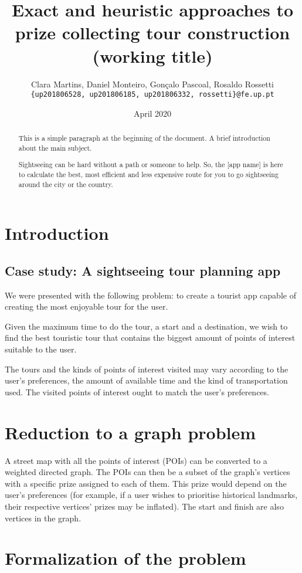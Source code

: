\documentclass{article}
\title{Exact and heuristic approaches to prize collecting tour construction (working title)}
\author{Clara Martins, Daniel Monteiro, Gonçalo Pascoal, Rosaldo Rossetti \\
\normalsize \texttt{\{up201806528, up201806185, up201806332, rossetti\}@fe.up.pt}}
\date{April 2020}
\begin{document}
\maketitle

\begin{abstract}
This is a simple paragraph at the beginning of the 
document. A brief introduction about the main subject.

Sightseeing can be hard without a path or someone to help. So, the [app name] is here to calculate the best, most efficient and less expensive route for you to go sightseeing around the city or the country.
\end{abstract}

\section{Introduction}

\subsection{Case study: A sightseeing tour planning app}
We were presented with the following problem: to create a tourist app capable of creating the most enjoyable tour for the user.

Given the maximum time to do the tour, a start and a destination, we wish to find the best touristic tour that contains the biggest amount of points of interest suitable to the user.

The tours and the kinds of points of interest visited may vary according to the user's preferences, the amount of available time and the kind of transportation used. The visited points of interest ought to match the user's preferences.

\section{Reduction to a graph problem}

A street map with all the points of interest (POIs) can be converted to a weighted directed graph. The POIs can then be a subset of the graph's vertices with a specific prize assigned to each of them. This prize would depend on the user's preferences (for example, if a user wishes to prioritise historical landmarks, their respective vertices' prizes may be inflated). The start and finish are also vertices in the graph. 

\section{Formalization of the problem}
\end{document}
